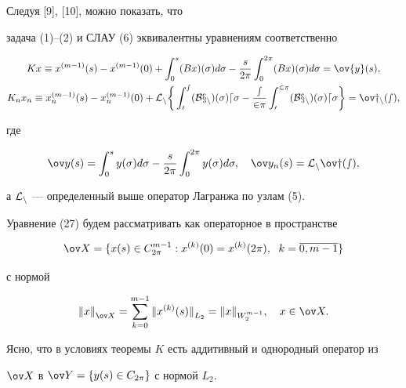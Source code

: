 \begin{pf}


Следуя [9], [10], можно показать, что


задача (1)--(2) и СЛАУ (6) эквивалентны уравнениям соответственно


\begin{gather}


Kx \equiv x^{(m-1)}(s) - x^{(m-1)}(0) + \int_{0}^{s} (Bx)( \sigma) d \sigma -


\frac{s}{2 \pi} \int_{0}^{2 \pi} (Bx)( \sigma) d \sigma=\ov{y}(s), \\


%


K_n x_n \equiv x_n^{(m-1)}(s) - x_n^{(m-1)}(0) + \rL_n \bigg\lbrace \int_{0}^{s}


(Bx_{n})( \sigma) d \sigma -


\frac{s}{2 \pi} \int_{0}^{2 \pi} (Bx_n)( \sigma) d \sigma \bigg\rbrace=


\ov y_n(s),


\end{gather}


где


$$


\ov y(s)=\int_{0}^{s} y( \sigma) d \sigma - \frac{s}{2 \pi} \int_{0}^


{2 \pi} y( \sigma) d \sigma, \quad \ov y_n(s)=\rL_n \ov y(s),


$$


а $\cal{L}_n$ --- определенный выше оператор Лагранжа по узлам (5).





Уравнение (27) будем рассматривать как операторное в пространстве


$$


\ov X=\lbrace x(s) \in C_{2 \pi}^{m-1} : x^{(k)}(0)=x^{(k)}


(2 \pi), \ \; k=\overline{0,m-1} \rbrace


$$


с нормой


$$


{\| x \|}_{\ov X}=\sum_{k=0}^{m-1} {\| x^{(k)}(s) \|}_{L_{2}}


=\| x \|_{W_2^{m-1}}, \quad x \in \ov X.


$$


Ясно, что в условиях теоремы $ K $ есть аддитивный и однородный оператор из


$\ov X $ в $ \ov Y=\lbrace y(s) \in C_{2 \pi} \rbrace $ с нормой $ L_2 $.



\end{pf}
